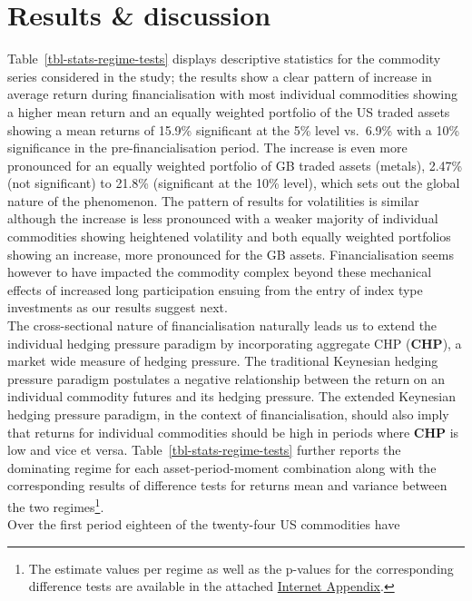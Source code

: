 \documentclass[
  authoryear,
  preprint,
  3p]{elsarticle}
\begin{document}
\newpage

\section{Results \& discussion}\label{sec-results}

Table~\ref{tbl-stats-regime-tests} displays descriptive statistics for
the commodity series considered in the study; the results show a clear
pattern of increase in average return during financialisation with most
individual commodities showing a higher mean return and an equally
weighted portfolio of the US traded assets showing a mean returns of
15.9\% significant at the 5\% level vs.~6.9\% with a 10\% significance
in the pre-financialisation period. The increase is even more pronounced
for an equally weighted portfolio of GB traded assets (metals), 2.47\%
(not significant) to 21.8\% (significant at the 10\% level), which sets
out the global nature of the phenomenon. The pattern of results for
volatilities is similar although the increase is less pronounced with a
weaker majority of individual commodities showing heightened volatility
and both equally weighted portfolios showing an increase, more
pronounced for the GB assets. Financialisation seems however to have
impacted the commodity complex beyond these mechanical effects of
increased long participation ensuing from the entry of index type
investments as our results suggest next.\\
The cross-sectional nature of financialisation naturally leads us to
extend the individual hedging pressure paradigm by incorporating
aggregate CHP (\textbf{CHP}), a market wide measure of hedging pressure.
The traditional Keynesian hedging pressure paradigm postulates a
negative relationship between the return on an individual commodity
futures and its hedging pressure. The extended Keynesian hedging
pressure paradigm, in the context of financialisation, should also imply
that returns for individual commodities should be high in periods where
\textbf{CHP} is low and vice et versa.
Table~\ref{tbl-stats-regime-tests} further reports the dominating regime
for each asset-period-moment combination along with the corresponding
results of difference tests for returns mean and variance between the
two regimes\footnote{The estimate values per regime as well as the
  p-values for the corresponding difference tests are available in the
  attached \href{https://bautheac.shinyapps.io/co-movement/}{Internet
  Appendix}.}.\\
Over the first period eighteen of the twenty-four US commodities have
\end{document}
